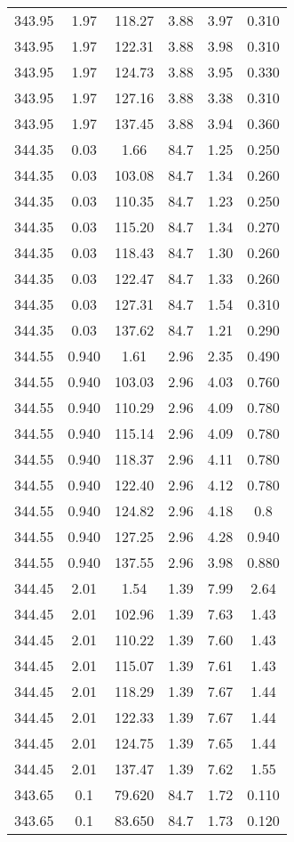 \begin{longtable}{||c|c|c|c|c|c||}
343.95	&1.97	&118.27	&3.88	&3.97	&0.310\\
343.95	&1.97	&122.31	&3.88	&3.98	&0.310\\
343.95	&1.97	&124.73	&3.88	&3.95	&0.330\\
343.95	&1.97	&127.16	&3.88	&3.38	&0.310\\
343.95	&1.97	&137.45	&3.88	&3.94	&0.360\\
344.35	&0.03	&1.66	&84.7	&1.25	&0.250\\
344.35	&0.03	&103.08	&84.7	&1.34	&0.260\\
344.35	&0.03	&110.35	&84.7	&1.23	&0.250\\
344.35	&0.03	&115.20	&84.7	&1.34	&0.270\\
344.35	&0.03	&118.43	&84.7	&1.30	&0.260\\
344.35	&0.03	&122.47	&84.7	&1.33	&0.260\\
344.35	&0.03	&127.31	&84.7	&1.54	&0.310\\
344.35	&0.03	&137.62	&84.7	&1.21	&0.290\\
344.55	&0.940	&1.61	&2.96	&2.35	&0.490\\
344.55	&0.940	&103.03	&2.96	&4.03	&0.760\\
344.55	&0.940	&110.29	&2.96	&4.09	&0.780\\
344.55	&0.940	&115.14	&2.96	&4.09	&0.780\\
344.55	&0.940	&118.37	&2.96	&4.11	&0.780\\
344.55	&0.940	&122.40	&2.96	&4.12	&0.780\\
344.55	&0.940	&124.82	&2.96	&4.18	&0.8\\
344.55	&0.940	&127.25	&2.96	&4.28	&0.940\\
344.55	&0.940	&137.55	&2.96	&3.98	&0.880\\
344.45	&2.01	&1.54	&1.39	&7.99	&2.64\\
344.45	&2.01	&102.96	&1.39	&7.63	&1.43\\
344.45	&2.01	&110.22	&1.39	&7.60	&1.43\\
344.45	&2.01	&115.07	&1.39	&7.61	&1.43\\
344.45	&2.01	&118.29	&1.39	&7.67	&1.44\\
344.45	&2.01	&122.33	&1.39	&7.67	&1.44\\
344.45	&2.01	&124.75	&1.39	&7.65	&1.44\\
344.45	&2.01	&137.47	&1.39	&7.62	&1.55\\
343.65	&0.1	&79.620	&84.7	&1.72	&0.110\\
343.65	&0.1	&83.650	&84.7	&1.73	&0.120\\

\end{longtable}

